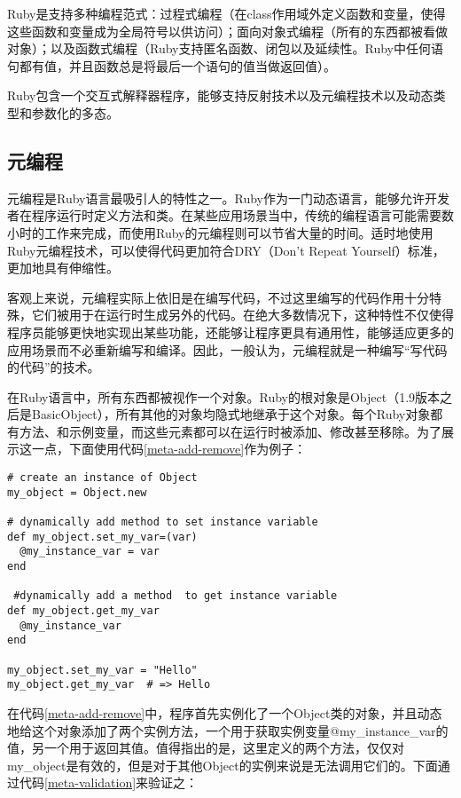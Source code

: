 Ruby是支持多种编程范式：过程式编程（在class作用域外定义函数和变量，使得这些函数和变量成为全局符号以供访问）；面向对象式编程（所有的东西都被看做对象）；以及函数式编程（Ruby支持匿名函数、闭包以及延续性。Ruby中任何语句都有值，并且函数总是将最后一个语句的值当做返回值）\supercite{ruby-pro}。

Ruby包含一个交互式解释器程序，能够支持反射技术以及元编程技术以及动态类型和参数化的多态。

\subsection{元编程}
元编程是Ruby语言最吸引人的特性之一\supercite{ruby-meta}。Ruby作为一门动态语言，能够允许开发者在程序运行时定义方法和类。在某些应用场景当中，传统的编程语言可能需要数小时的工作来完成，而使用Ruby的元编程则可以节省大量的时间。适时地使用Ruby元编程技术，可以使得代码更加符合DRY（Don't Repeat Yourself）标准，更加地具有伸缩性。

客观上来说，元编程实际上依旧是在编写代码，不过这里编写的代码作用十分特殊，它们被用于在运行时生成另外的代码。在绝大多数情况下，这种特性不仅使得程序员能够更快地实现出某些功能，还能够让程序更具有通用性，能够适应更多的应用场景而不必重新编写和编译。因此，一般认为，元编程就是一种编写“写代码的代码”的技术\supercite{ruby-meta}。

在Ruby语言中，所有东西都被视作一个对象。Ruby的根对象是Object（1.9版本之后是BasicObject），所有其他的对象均隐式地继承于这个对象。每个Ruby对象都有方法、和示例变量，而这些元素都可以在运行时被添加、修改甚至移除。为了展示这一点，下面使用代码\ref{meta-add-remove}作为例子：

\begin{lstlisting}[caption={验证实例方法的动态添加}, label=meta-add-remove]
# create an instance of Object
my_object = Object.new

# dynamically add method to set instance variable
def my_object.set_my_var=(var)
  @my_instance_var = var
end

 #dynamically add a method  to get instance variable
def my_object.get_my_var
  @my_instance_var
end

my_object.set_my_var = "Hello"
my_object.get_my_var  # => Hello
\end{lstlisting}

在代码\ref{meta-add-remove}中，程序首先实例化了一个Object类的对象，并且动态地给这个对象添加了两个实例方法，一个用于获取实例变量@my\_instance\_var的值，另一个用于返回其值。值得指出的是，这里定义的两个方法，仅仅对my\_object是有效的，但是对于其他Object的实例来说是无法调用它们的。下面通过代码\ref{meta-validation}来验证之：

